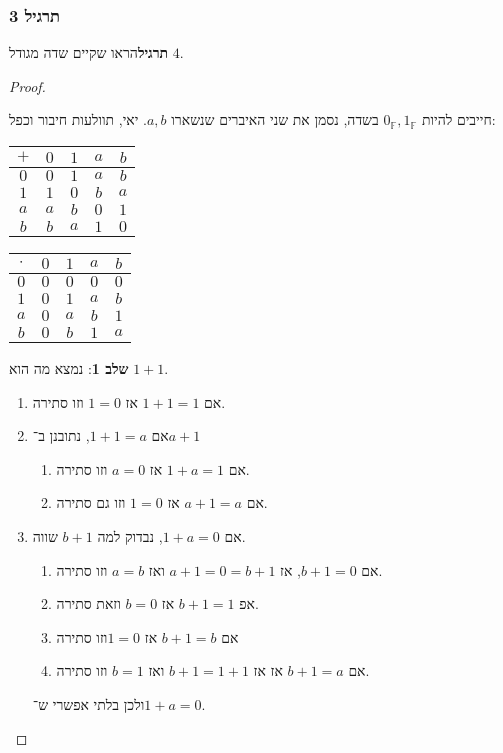 \documentclass[]{article}
\newcommand\F     {\mathbb{F}}
\newcommand\zf    {0_\F}
\newcommand\of    {1_\F}
\begin{document}
	\subsubsection{תרגיל 3}
	\textbf{תרגיל}הראו שקיים שדה מגודל $4$. 
	
	\begin{proof}
		\begin{multicols}{2}
			
			חייבים להיות $\zf, \of$ בשדה, נסמן את שני האיברים שנשארו $a, b$. יאי, תוולעות חיבור וכפל: 
			
			{
				\hfil \begin{tabular}{|c|c|c|c|c|}
					\hline $+$ & $0$ & $1$ & $a$ & $b$ \\
					\hline $0$ & $0$ & $1$ & $a$ & $b$ \\
					\hline $1$ & $1$ & $0$ & $b$ & $a$ \\
					\hline $a$ & $a$ & $b$ & $0$ & $1$ \\
					\hline $b$ & $b$ & $a$ & $1$ & $0$ \\
					\hline 
				\end{tabular}
				\hfil
				\begin{tabular}{|c|c|c|c|c|}
					\hline $\cdot $ & $0$ & $1$ & $a$ & $b$ \\
					\hline $0$ & $0$ & $0$ & $0$ & $0$ \\
					\hline $1$ & $0$ & $1$ & $a$ & $b$ \\
					\hline $a$ & $0$ & $a$ & $b$ & $1$ \\
					\hline $b$ & $0$ & $b$ & $1$ & $a$ \\
					\hline
				\end{tabular}
				
				\hfil 
			}
			
			\textbf{שלב 1}: נמצא מה הוא $1 + 1$. 
			\begin{enumerate}
				\item אם $1 + 1 = 1$ אז $1 = 0$ וזו סתירה. 
				\item אם $1 + 1 = a$, נתובנן ב־$a + 1$
				\begin{enumerate}
					\item אם $1 + a = 1$ אז $a = 0$ וזו סתירה. 
					\item אם $a + 1 = a$ אז $1 = 0$ וזו גם סתירה. 
				\end{enumerate}
				\item אם $1 + a = 0$, נבדוק למה $b + 1$ שווה. 
				\begin{enumerate}
					\item אם $b + 1 = 0$, אז $a + 1 = 0 = b + 1$ ואז $a = b$ וזו סתירה. 
					\item אפ $b + 1 = 1$ אז $b = 0$ וזאת סתירה. 
					\item אם $b + 1 = b$ אז $1 = 0 $וזו סתירה
					\item  אם $b + 1 = a$ אז  אז $b +1  = 1 + 1$ ואז $b =1 $ וזו סתירה. 
				\end{enumerate}
				ולכן בלתי אפשרי ש־$1 + a = 0$. 
			\end{enumerate}
			

\end{multicols}
\end{proof}
\end{document}

